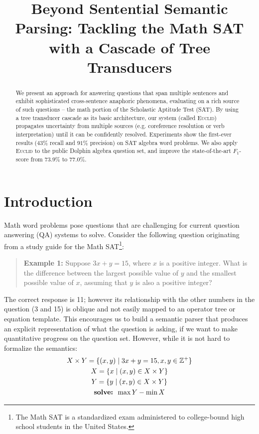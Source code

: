 \documentclass[11pt,letterpaper]{article}
\title{Beyond Sentential Semantic Parsing: Tackling the Math SAT with a Cascade of Tree Transducers}
\author{Mark Hopkins, Cristian Petrescu-Prahova, Roie Levin, \\ {\bf Ronan Le Bras, Alvaro Herrasti, \and Vidur Joshi} \\
        Allen Institute for Artificial Intelligence \\ Seattle, WA}
\date{}
\begin{document}
\maketitle

\begin{abstract}
  We present an approach for answering questions that span multiple sentences and exhibit sophisticated cross-sentence anaphoric phenomena, evaluating on a rich source of such questions -- the math portion of the Scholastic Aptitude Test (SAT). By using a tree transducer cascade as its basic architecture, our system (called \textsc{Euclid}) propagates uncertainty from multiple sources (e.g. coreference resolution or verb interpretation) until it can be confidently resolved. Experiments show the first-ever results ($43\%$ recall and $91\%$ precision) on SAT algebra word problems. We also apply \textsc{Euclid} to the public Dolphin algebra question set, and improve the state-of-the-art $F_1$-score from 73.9\% to 77.0\%.
\end{abstract}



\section{Introduction\label{sec:intro}}

Math word problems pose questions that are challenging for current question answering (QA) systems to solve. Consider the following question originating from a study guide for the Math SAT\footnote{The Math SAT is a standardized exam administered to college-bound high school students in the United States.}:
\begin{quote}
\textbf{Example 1:} Suppose $3x+y=15$, where $x$ is a positive integer. What is the difference between the largest possible value of $y$ and the smallest possible value of $x$, assuming that $y$ is also a positive integer?		
\end{quote}

\noindent The correct response is 11; however its relationship with the other numbers in the question (3 and 15) is oblique and not easily mapped to an operator tree or equation template. This encourages us to build a semantic parser that produces an explicit representation of what the question is asking, if we want to make quantitative progress on the question set. However, while it is not hard to formalize the semantics:
\begin{gather*}
	X \times Y = \{(x,y) \mid 3x+y=15, x,y \in \mathbb{Z^+} \} \\
	X = \{x \mid (x,y) \in X \times Y\} \\
	Y = \{y \mid (x,y) \in X \times Y\} \\
	\mbox{\textbf{solve: }} \max{Y} - \min{X}
\end{gather*}
\end{document}
